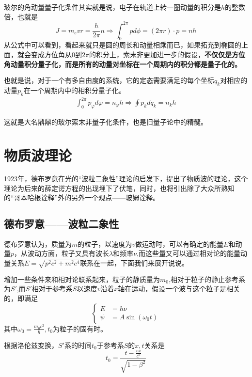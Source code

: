 \documentclass{article}
\newcommand{\ds}{\displaystyle}
\begin{document}
玻尔的角动量量子化条件其实就是说，电子在轨道上转一圈动量的积分是$h$的整数倍，也就是
\begin{equation*}
    J=m_evr=\frac{h}{2\pi}n\Rightarrow\int_0^{2\pi}pd\phi=(2\pi r)\cdot p=nh
\end{equation*}
从公式中可以看到，看起来就只是圆的周长和动量相乘而已，如果拓充到椭圆的上面，就会变成方位角从$0$到$2\pi$的积分上，索末非更加进一步的假设，\textbf{不仅仅是方位角动量积分量子化，而是所有的动量对坐标在一个周期内的积分都是量子化的。}

也就是说，对于一个有多自由度的系统，它的定态需要满足的每个坐标$q_k$对相应的动量$p_k$在一个周期内中的相积分量子化。
\begin{align*}
    \int_0^{2\pi}p_\varphi d\varphi =n_\varphi h
    \Rightarrow \oint p_kdq_k = n_k h
\end{align*}

这就是大名鼎鼎的玻尔索末非量子化条件，也是旧量子论中的精髓。




\section{物质波理论}
1923年，德布罗意在光的“波粒二象性”理论的启发下，提出了物质波的理论，这个理论为后来的薛定谔方程的出现埋下了伏笔，同时，也将引出除了大众所熟知的“哥本哈根诠释”外的另外一个观点——玻姆诠释。

\subsection{德布罗意——波粒二象性}

德布罗意认为，质量为$m$的粒子，以速度为$v$做运动时，可以有确定的能量$E$和动量$p$，从波动方面，粒子又具有波长$\lambda$和频率$\nu$,而这些量又可以通过相对论的能量动量关系$\ds{E=\sqrt{p^2c^2+m^2c^4}}$联系在一起，下面我们来展开说说。

增加一些条件来和相对论联系起来，粒子的静质量为$m_0$,相对于粒子的静止参考系为$S'$,而$S'$相对于参考系$S$以速度$v$沿着$x$轴在运动，假设一个波与这个粒子是相关的，即满足
\begin{equation*}
    \begin{cases}
        E&=h\nu\\
        \psi&=A\sin(\omega_0t)
    \end{cases}
\end{equation*}
其中$\ds\omega_0=\frac{m_0c^2}{\hbar},t_0$为粒子的固有时。

根据洛伦兹变换，$S'$系的时间$t_0$于参考系$S$的$x,t$关系是
\[t_0=\frac{t-\frac{vx}{c^2}}{\sqrt{1-\beta^2}}\]
\end{document}
